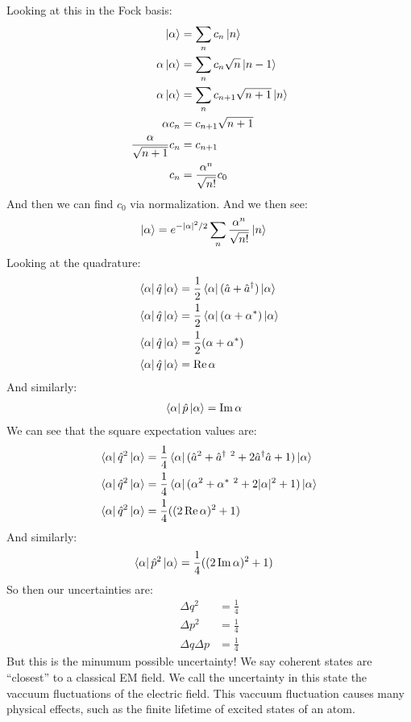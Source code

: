 Looking at this in the Fock basis:
\begin{align*}
	\ket{\alpha} &= \sum_n c_n \ket{n} \\
	\alpha\ket{\alpha} &= \sum_n c_n \sqrt{n}\ket{n-1} \\
	\alpha\ket{\alpha} &= \sum_n c_{n+1} \sqrt{n+1}\ket{n} \\
	\alpha c_n &= c_{n+1} \sqrt{n+1} \\
	\frac{\alpha}{\sqrt{n+1}} c_n &= c_{n+1}  \\
	c_{n} &= \frac{\alpha^n}{\sqrt{n!}} c_0
\end{align*}
And then we can find $c_0$ via normalization. And we then see:
\begin{align*}
	\ket{\alpha} &= e^{-|\alpha|^2/2} \sum_n \frac{\alpha^n}{\sqrt{n!}} \ket{n}
\end{align*}
Looking at the quadrature:
\begin{align*}
	\bra{\alpha}\hat{q}\ket{\alpha} &= \frac{1}{2}\bra{\alpha}(\hat{a} + \hat{a}^\dagger)\ket{\alpha} \\ 
	\bra{\alpha}\hat{q}\ket{\alpha} &= \frac{1}{2}\bra{\alpha}(\alpha + \alpha^*)\ket{\alpha} \\ 
	\bra{\alpha}\hat{q}\ket{\alpha} &= \frac{1}{2}(\alpha + \alpha^*) \\ 
	\bra{\alpha}\hat{q}\ket{\alpha} &= \Re\alpha
\end{align*}
And similarly:
\begin{align*}
	\bra{\alpha}\hat{p}\ket{\alpha} &= \Im\alpha
\end{align*}
We can see that the square expectation values are:
\begin{align*}
	\bra{\alpha}\hat{q}^2\ket{\alpha} &= \frac{1}{4}\bra{\alpha}(\hat{a}^2 +\hat{a}^\dagger\ ^2 + 2\hat{a}^\dagger\hat{a} + 1)\ket{\alpha} \\
	\bra{\alpha}\hat{q}^2\ket{\alpha} &= \frac{1}{4}\bra{\alpha}(\alpha^2 +\alpha^*\ ^2 + 2|\alpha|^2 + 1)\ket{\alpha} \\
	\bra{\alpha}\hat{q}^2\ket{\alpha} &= \frac{1}{4}((2\Re\alpha)^2 + 1)
\end{align*}
And similarly:
\begin{align*}
	\bra{\alpha}\hat{p}^2\ket{\alpha} &= \frac{1}{4}((2\Im\alpha)^2 + 1)
\end{align*}
So then our uncertainties are:
\begin{align*}
	\Delta q^2 &= \frac{1}{4} \\
	\Delta p^2 &= \frac{1}{4} \\
	\Delta q\Delta p &= \frac{1}{4}
\end{align*}
But this is the minumum possible uncertainty! We say coherent states are ``closest'' to a classical EM field. We call the uncertainty in this state the vaccuum fluctuations of the electric field.
This vaccuum fluctuation causes many physical effects, such as the finite lifetime of excited states of an atom.

